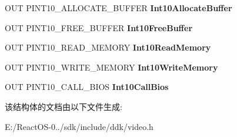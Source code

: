 \begin{DoxyCompactItemize}
O\+UT P\+I\+N\+T10\+\_\+\+A\+L\+L\+O\+C\+A\+T\+E\+\_\+\+B\+U\+F\+F\+ER {\bfseries Int10\+Allocate\+Buffer}
\item 
\mbox{\label{struct___v_i_d_e_o___p_o_r_t___i_n_t10___i_n_t_e_r_f_a_c_e_a2ef7cd591ee90f1504a44516fb8ccd2c}} 
O\+UT P\+I\+N\+T10\+\_\+\+F\+R\+E\+E\+\_\+\+B\+U\+F\+F\+ER {\bfseries Int10\+Free\+Buffer}
\item 
\mbox{\label{struct___v_i_d_e_o___p_o_r_t___i_n_t10___i_n_t_e_r_f_a_c_e_a4c67d19a3d15ea176792e31547387362}} 
O\+UT P\+I\+N\+T10\+\_\+\+R\+E\+A\+D\+\_\+\+M\+E\+M\+O\+RY {\bfseries Int10\+Read\+Memory}
\item 
\mbox{\label{struct___v_i_d_e_o___p_o_r_t___i_n_t10___i_n_t_e_r_f_a_c_e_aef47ac217a70a3ab2556be9dbc12b3d8}} 
O\+UT P\+I\+N\+T10\+\_\+\+W\+R\+I\+T\+E\+\_\+\+M\+E\+M\+O\+RY {\bfseries Int10\+Write\+Memory}
\item 
\mbox{\label{struct___v_i_d_e_o___p_o_r_t___i_n_t10___i_n_t_e_r_f_a_c_e_a74265c3ae30ed820fc4313e2fdb2eda3}} 
O\+UT P\+I\+N\+T10\+\_\+\+C\+A\+L\+L\+\_\+\+B\+I\+OS {\bfseries Int10\+Call\+Bios}
\end{DoxyCompactItemize}


该结构体的文档由以下文件生成\+:\begin{DoxyCompactItemize}
\item 
E\+:/\+React\+O\+S-\/0../sdk/include/ddk/video.\+h\end{DoxyCompactItemize}
